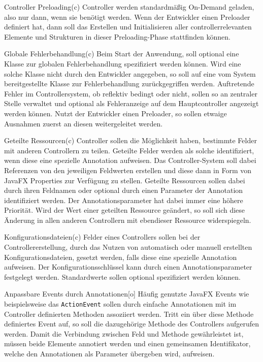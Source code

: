 \begin{freq}{Controller Preloading}(c)
	Controller werden standardmäßig On-Demand geladen, also nur dann, wenn sie benötigt werden. Wenn der Entwickler einen Preloader definiert hat, dann soll das Erstellen und Initialisieren aller controllerrelevanten Elemente und Strukturen in dieser Preloading-Phase stattfinden können.
\end{freq}
\begin{freq}{Globale Fehlerbehandlung}(c)
	Beim Start der Anwendung, soll optional eine Klasse zur globalen Fehlerbehandlung spezifiziert werden können. Wird eine solche Klasse nicht durch den Entwickler angegeben, so soll auf eine vom System bereitgestellte Klasse zur Fehlerbehandlung zurückgegriffen werden. Auftretende Fehler im Controllersystem, ob reflektiv bedingt oder nicht, sollen so an zentraler Stelle verwaltet und optional als Fehleranzeige auf dem Hauptcontroller angezeigt werden können. Nutzt der Entwickler einen Preloader, so sollen etwaige Ausnahmen zuerst an diesen weitergeleitet werden.
\end{freq}
\begin{freq}{Geteilte Ressourcen}(c)
	Controller sollen die Möglichkeit haben, bestimmte Felder mit anderen Controllern zu teilen. Geteilte Felder werden als solche identifiziert, wenn diese eine spezielle Annotation aufweisen. Das Controller-System soll dabei Referenzen von den jeweiligen Feldwerten erstellen und diese dann in Form von JavaFX Properties zur Verfügung zu stellen. Geteilte Ressourcen sollen dabei durch ihren Feldnamen oder optional durch einen Parameter der Annotation identifiziert werden. Der Annotationsparameter hat dabei immer eine höhere Priorität. Wird der Wert einer geteilten Ressource geändert, so soll sich diese Änderung in allen anderen Controllern mit ebendieser Ressource widerspiegeln.
\end{freq}
\begin{freq}{Konfigurationsdateien}(c)
	Felder eines Controllers sollen bei der Controllererstellung, durch das Nutzen von automatisch oder manuell erstellten Konfigurationsdateien, gesetzt werden, falls diese eine spezielle Annotation aufweisen. Der Konfigurationsschlüssel kann durch einen Annotationsparameter festgelegt werden. Standardwerte sollen optional spezifiziert werden können.
\end{freq}
\begin{freq}{Anpassbare Events durch Annotationen}[o]
	Häufig genutzte JavaFX Events wie beispielsweise das \texttt{ActionEvent} sollen durch einfache Annotationen mit im Controller definierten Methoden assoziiert werden. Tritt ein über diese Methode definiertes Event auf, so soll die dazugehörige Methode des Controllers aufgerufen werden. Damit die Verbindung zwischen Feld und Methode gewährleistet ist, müssen beide Elemente annotiert werden und einen gemeinsamen Identifikator, welche den Annotationen als Parameter übergeben wird, aufweisen.
\end{freq}
